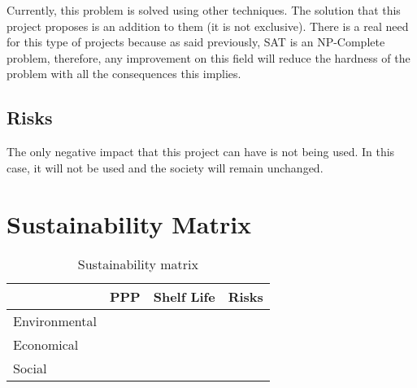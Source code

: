 Currently, this problem is solved using other techniques. The solution that this project proposes is an addition to them (it is not exclusive). There is a real need for this type of projects because as said previously, SAT is an NP-Complete problem, therefore, any improvement on this field will reduce the hardness of the problem with all the consequences this implies.

\subsection{Risks}
The only negative impact that this project can have is not being used. In this case, it will not be used and the society will remain unchanged.


\section{Sustainability Matrix}
\begin{table}[h]
	\centering
	\begin{tabular}{l|l|l|l|}
		\cline{2-4}
		 & PPP & Shelf Life & Risks \\ \hline
		\multicolumn{1}{|l|}{Environmental} & & & \\ \hline
		\multicolumn{1}{|l|}{Economical} & & & \\ \hline
		\multicolumn{1}{|l|}{Social} & & & \\ \hline
	\end{tabular}
	\caption{Sustainability matrix}
	\label{SustainabilityMatrix}
\end{table}

